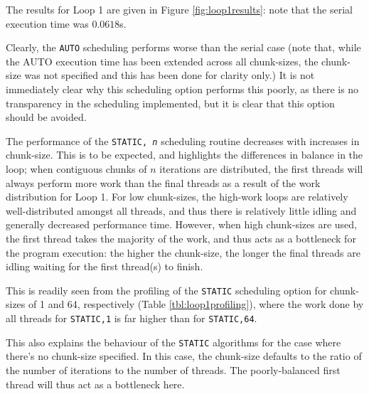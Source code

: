 \documentclass{article} %
\newcommand{\tp}{\texttt}
\begin{document}
The results for Loop 1 are given in Figure \ref{fig:loop1results}: note that the serial execution time was $0.0618$s.

Clearly, the \tp{AUTO} scheduling performs worse than the serial case (note that, while the AUTO execution time has been extended across all chunk-sizes, the chunk-size was not specified and this has been done for clarity only.)
It is not immediately clear why this scheduling option performs this poorly, as there is no transparency in the scheduling implemented, but it is clear that this option should be avoided.

The performance of the \tp{STATIC, \textit{n}} scheduling routine decreases with increases in chunk-size.
This is to be expected, and highlights the differences in balance in the loop; when contiguous chunks of $n$ iterations are distributed, the first threads will always perform more work than the final threads as a result of the work distribution for Loop 1.
For low chunk-sizes, the high-work loops are relatively well-distributed amongst all threads, and thus there is relatively little idling and generally decreased performance time.
However, when high chunk-sizes are used, the first thread takes the majority of the work, and thus acts as a bottleneck for the program execution: the higher the chunk-size, the longer the final threads are idling waiting for the first thread(s) to finish.

This is readily seen from the profiling of the \tp{STATIC} scheduling option for chunk-sizes of 1 and 64, respectively (Table \ref{tbl:loop1profiling}), where the work done by all threads for \tp{STATIC,1} is far higher than for \tp{STATIC,64}.

This also explains the behaviour of the \tp{STATIC} algorithms for the case where there's no chunk-size specified.
In this case, the chunk-size defaults to the ratio of the number of iterations to the number of threads.
The poorly-balanced first thread will thus act as a bottleneck here.
\end{document}
